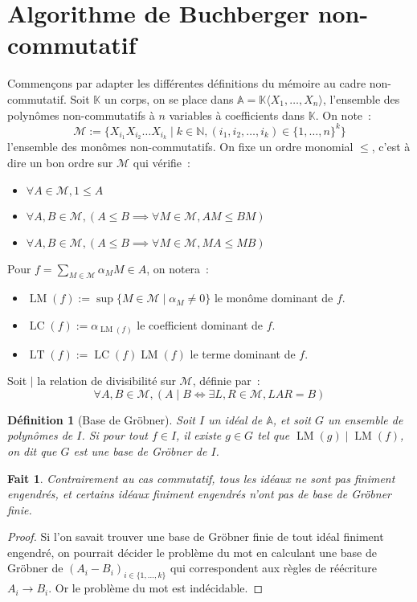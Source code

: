 \documentclass{article}
\newtheorem*{fact}{Fait}
\newtheorem*{dfn}{Définition}
\newcommand{\N}{\mathbb{N}}
\newcommand{\K}{\mathbb{K}}
\newcommand{\chev}[1]{\langle #1 \rangle}
\newcommand{\A}{\mathbb{A}}
\newcommand{\M}{\mathcal{M}}
\DeclareMathOperator{\LM}{LM}
\DeclareMathOperator{\LC}{LC}
\DeclareMathOperator{\LT}{LT}
\begin{document}
\section*{Algorithme de Buchberger non-commutatif}
Commençons par adapter les différentes définitions du mémoire au cadre non-commutatif.
Soit $\K$ un corps, on se place dans $\A = \K \chev{X_1, \dots, X_n}$, l'ensemble des polynômes non-commutatifs à $n$ variables à coefficients dans $\K$. On note~: 
$$\M := \{X_{i_1}X_{i_2} \dots X_{i_k} \;|\; k \in \N, (i_1, i_2, \dots, i_k) \in \{1, \dots, n\}^k \}$$
l'ensemble des monômes non-commutatifs. On fixe un ordre monomial $\leq$, c'est à dire un bon ordre sur $\M$ qui vérifie~:
\begin{itemize}
\item $\forall A \in \M, 1 \leq A$
\item $\forall A, B \in \M, (A \leq B \implies \forall M \in \M, AM \leq BM)$
\item $\forall A, B \in \M, (A \leq B \implies \forall M \in \M, MA \leq MB)$
\end{itemize}
Pour $f = \sum_{M \in \M} \alpha_M M \in A$, on notera~:
\begin{itemize}
\item $\LM(f) := \sup \{ M \in \M \;|\; \alpha_M \neq 0 \}$ le monôme dominant de $f$.
\item $\LC(f) := \alpha_{\LM(f)}$ le coefficient dominant de $f$.
\item $\LT(f) := \LC(f)\LM(f)$ le terme dominant de $f$.
\end{itemize}
Soit $|$ la relation de divisibilité sur $\M$, définie par~:
$$\forall A, B \in \M, (A \;|\; B \iff \exists L, R \in \M, LAR = B)$$

\begin{dfn}[Base de Gröbner]
	Soit $I$ un idéal de $\A$, et soit $G$ un ensemble de polynômes de $I$.
	Si pour tout $f \in I$, il existe $g \in G$ tel que $\LM(g) \;|\; \LM(f)$, on dit que $G$ est une base de Gröbner de $I$.
\end{dfn}

\begin{fact}
	Contrairement au cas commutatif, tous les idéaux ne sont pas finiment engendrés, et certains idéaux finiment engendrés n'ont pas de base de Gröbner finie.
\end{fact}
\begin{proof}
	Si l'on savait trouver une base de Gröbner finie de tout idéal finiment engendré, on pourrait décider le problème du mot en calculant une base de Gröbner de $(A_i - B_i)_{i \in \{1, \dots, k\}}$ qui correspondent aux règles de réécriture $A_i \rightarrow B_i$. 
	Or le problème du mot est indécidable.
\end{proof}
\end{document}
